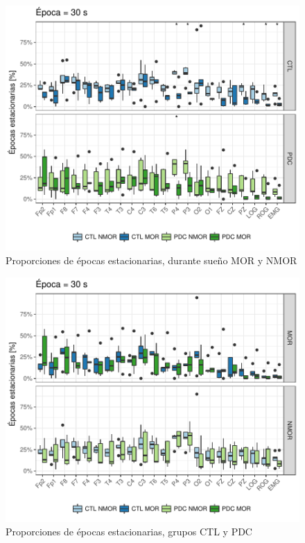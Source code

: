 \begin{figure}
\centering
\includegraphics[width=\linewidth]
{./img_art_dfa/Comparacion_gpos_CTL_PDC_v3.pdf}
\caption{Proporciones de épocas estacionarias, durante sueño MOR y NMOR}
\label{comparacion_verde}
\end{figure}

\begin{figure}
\centering
\includegraphics[width=\linewidth]
{./img_art_dfa/Comparacion_gpos_MOR_NMOR_v3.pdf}
\caption{Proporciones de épocas estacionarias, grupos CTL y PDC}
\label{comparacion_graf}
\end{figure}

